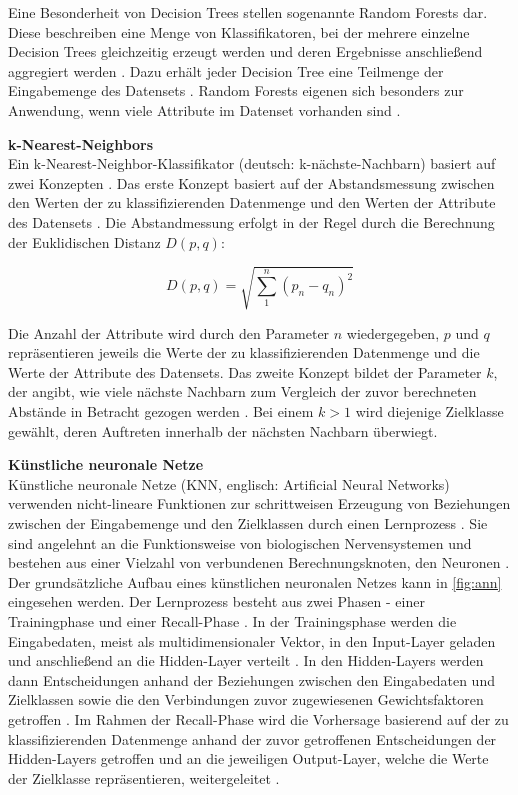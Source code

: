 Eine Besonderheit von Decision Trees stellen sogenannte Random Forests dar. Diese beschreiben eine Menge von Klassifikatoren, bei der mehrere einzelne Decision Trees gleichzeitig erzeugt werden und deren Ergebnisse anschließend aggregiert werden \cite{Alam2013}. Dazu erhält jeder Decision Tree eine Teilmenge der Eingabemenge des Datensets \cite{Alam2013}. Random Forests eigenen sich besonders zur Anwendung, wenn viele Attribute im Datenset vorhanden sind \cite{Alam2013}.

\textbf{k-Nearest-Neighbors\medskip}\\
Ein k-Nearest-Neighbor-Klassifikator (deutsch: k-nächste-Nachbarn) basiert auf zwei Konzepten \cite{Zhang2016}. Das erste Konzept basiert auf der Abstandsmessung zwischen den Werten der zu klassifizierenden Datenmenge und den Werten der Attribute des Datensets \cite{Zhang2016}. Die Abstandmessung erfolgt in der Regel durch die Berechnung der Euklidischen Distanz $D(p,q)$:

\[D(p,q) = \sqrt{\sum_1^n(p_{n}-q_{n})^{2}}\] 

Die Anzahl der Attribute wird durch den Parameter $n$ wiedergegeben, $p$ und $q$ repräsentieren jeweils die Werte der zu klassifizierenden Datenmenge und die Werte der Attribute des Datensets. Das zweite Konzept bildet der Parameter $k$, der angibt, wie viele nächste Nachbarn zum Vergleich der zuvor berechneten Abstände in Betracht gezogen werden \cite{Zhang2016}. Bei einem $k > 1$ wird diejenige Zielklasse gewählt, deren Auftreten innerhalb der nächsten Nachbarn überwiegt.

\textbf{Künstliche neuronale Netze\medskip}\\
Künstliche neuronale Netze (KNN, englisch: Artificial Neural Networks) verwenden nicht-lineare Funktionen zur schrittweisen Erzeugung von Beziehungen zwischen der Eingabemenge und den Zielklassen durch einen Lernprozess \cite{Linder2004}. Sie sind angelehnt an die Funktionsweise von biologischen Nervensystemen und bestehen aus einer Vielzahl von verbundenen Berechnungsknoten, den Neuronen \cite{OShea2015}. Der grundsätzliche Aufbau eines künstlichen neuronalen Netzes kann in \autoref{fig:ann} eingesehen werden. Der Lernprozess besteht aus zwei Phasen - einer Trainingphase und einer Recall-Phase \cite{Linder2004}. In der Trainingsphase werden die Eingabedaten, meist als multidimensionaler Vektor, in den Input-Layer geladen und anschließend an die Hidden-Layer verteilt \cite{OShea2015}. In den Hidden-Layers werden dann Entscheidungen anhand der Beziehungen zwischen den Eingabedaten und Zielklassen sowie die den Verbindungen zuvor zugewiesenen Gewichtsfaktoren getroffen \cite{Linder2004,OShea2015}. Im Rahmen der Recall-Phase wird die Vorhersage basierend auf der zu klassifizierenden Datenmenge anhand der zuvor getroffenen Entscheidungen der Hidden-Layers getroffen und an die jeweiligen Output-Layer, welche die Werte der Zielklasse repräsentieren, weitergeleitet \cite{Linder2004}. 

